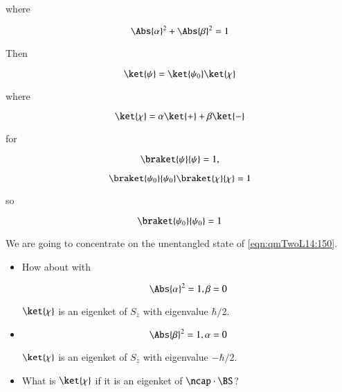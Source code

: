 where 

\begin{equation}\label{eqn:qmTwoL14:250}
\Abs{\alpha}^2 + \Abs{\beta}^2 = 1
\end{equation}

Then

\begin{equation}\label{eqn:qmTwoL14:150}
\ket{\psi} = \ket{\psi_0} \ket{\chi}
\end{equation}

where 

\begin{equation}\label{eqn:qmTwoL14:270}
\ket{\chi} = \alpha \ket{+} + \beta \ket{-}
\end{equation}

for 

\begin{equation}\label{eqn:qmTwoL14:290}
\braket{\psi}{\psi} = 1,
\end{equation}

\begin{equation}\label{eqn:qmTwoL14:310}
\braket{\psi_0}{\psi_0} 
\braket{\chi}{\chi}  = 1
\end{equation}

so

\begin{equation}\label{eqn:qmTwoL14:330}
\braket{\psi_0}{\psi_0} = 1
\end{equation}

We are going to concentrate on the unentangled state of \ref{eqn:qmTwoL14:150}.

\begin{itemize}
\item
How about with

\begin{equation}\label{eqn:qmTwoL14:350}
\Abs{\alpha}^2 = 1, \beta = 0
\end{equation}

$\ket{\chi}$ is an eigenket of $S_z$ with eigenvalue $\hbar/2$.
\item

\begin{equation}\label{eqn:qmTwoL14:370}
\Abs{\beta}^2 = 1, \alpha = 0
\end{equation}

$\ket{\chi}$ is an eigenket of $S_z$ with eigenvalue $-\hbar/2$.

\item
What is $\ket{\chi}$ if it is an eigenket of $\ncap \cdot \BS$?
\end{itemize}

